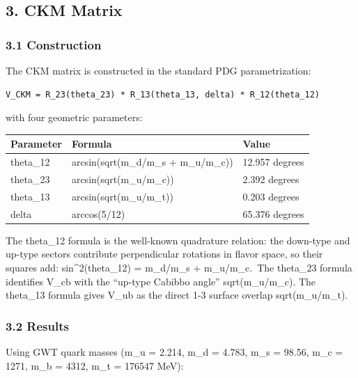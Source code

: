 \documentclass[
]{article}
\newcounter{none} %
\begin{document}
\subsection{3. CKM Matrix}\label{ckm-matrix}

\subsubsection{3.1 Construction}\label{construction}

The CKM matrix is constructed in the standard PDG parametrization:

\begin{verbatim}
V_CKM = R_23(theta_23) * R_13(theta_13, delta) * R_12(theta_12)
\end{verbatim}

with four geometric parameters:

{\def\LTcaptype{none} %
\begin{longtable}[]{@{}lll@{}}
\toprule\noalign{}
Parameter & Formula & Value \\
\midrule\noalign{}
\endhead
\bottomrule\noalign{}
\endlastfoot
theta\_12 & arcsin(sqrt(m\_d/m\_s + m\_u/m\_c)) & 12.957 degrees \\
theta\_23 & arcsin(sqrt(m\_u/m\_c)) & 2.392 degrees \\
theta\_13 & arcsin(sqrt(m\_u/m\_t)) & 0.203 degrees \\
delta & arccos(5/12) & 65.376 degrees \\
\end{longtable}
}

The theta\_12 formula is the well-known quadrature relation: the
down-type and up-type sectors contribute perpendicular rotations in
flavor space, so their squares add: sin\^{}2(theta\_12) = m\_d/m\_s +
m\_u/m\_c.~The theta\_23 formula identifies V\_cb with the ``up-type
Cabibbo angle'' sqrt(m\_u/m\_c). The theta\_13 formula gives V\_ub as
the direct 1-3 surface overlap sqrt(m\_u/m\_t).

\subsubsection{3.2 Results}\label{results}

Using GWT quark masses (m\_u = 2.214, m\_d = 4.783, m\_s = 98.56, m\_c =
1271, m\_b = 4312, m\_t = 176547 MeV):
\end{document}
